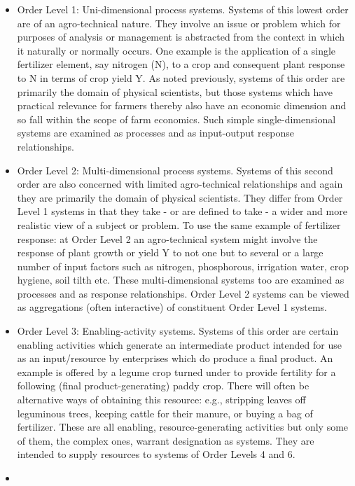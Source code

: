 \documentclass[11pt,]{book}
\theoremstyle{definition}
\theoremstyle{definition}
\theoremstyle{definition}
\theoremstyle{remark}
\begin{document}
\begin{itemize}
\item
  Order Level 1: Uni-dimensional process systems. Systems of this lowest
  order are of an agro-technical nature. They involve an issue or
  problem which for purposes of analysis or management is abstracted
  from the context in which it naturally or normally occurs. One example
  is the application of a single fertilizer element, say nitrogen (N),
  to a crop and consequent plant response to N in terms of crop yield Y.
  As noted previously, systems of this order are primarily the domain of
  physical scientists, but those systems which have practical relevance
  for farmers thereby also have an economic dimension and so fall within
  the scope of farm economics. Such simple single-dimensional systems
  are examined as processes and as input-output response relationships.
\item
  Order Level 2: Multi-dimensional process systems. Systems of this
  second order are also concerned with limited agro-technical
  relationships and again they are primarily the domain of physical
  scientists. They differ from Order Level 1 systems in that they take -
  or are defined to take - a wider and more realistic view of a subject
  or problem. To use the same example of fertilizer response: at Order
  Level 2 an agro-technical system might involve the response of plant
  growth or yield Y to not one but to several or a large number of input
  factors such as nitrogen, phosphorous, irrigation water, crop hygiene,
  soil tilth etc. These multi-dimensional systems too are examined as
  processes and as response relationships. Order Level 2 systems can be
  viewed as aggregations (often interactive) of constituent Order Level
  1 systems.
\item
  Order Level 3: Enabling-activity systems. Systems of this order are
  certain enabling activities which generate an intermediate product
  intended for use as an input/resource by enterprises which do produce
  a final product. An example is offered by a legume crop turned under
  to provide fertility for a following (final product-generating) paddy
  crop. There will often be alternative ways of obtaining this resource:
  e.g., stripping leaves off leguminous trees, keeping cattle for their
  manure, or buying a bag of fertilizer. These are all enabling,
  resource-generating activities but only some of them, the complex
  ones, warrant designation as systems. They are intended to supply
  resources to systems of Order Levels 4 and 6.
\item

\end{itemize}
\end{document}
